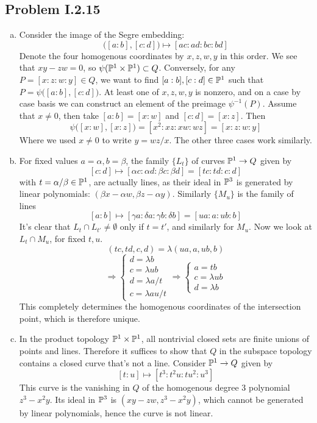 \documentclass{mathnotes}
\begin{document}
\subsection*{Problem I.2.15}
\begin{enumerate}[(a)]
\item Consider the image of the Segre embedding:
\[     \big( [a:b] , [c:d]\big) \mapsto [ac : ad : bc : bd]    \]
Denote the four homogenous coordinates by $x, z, w, y$ in this order. We see that $xy - zw = 0$, so $\psi(\mathbb{P}^1 \times \mathbb{P}^1) \subset Q$. Conversely, for any $P = [x:z:w:y] \in Q$, we want to find $[a:b], [c:d] \in \mathbb{P}^1$ such that $P = \psi\big([a:b], [c:d] \big)$. At least one of $x,z,w,y$ is nonzero, and on a case by case basis we can construct an element of the preimage $\psi^{-1}(P)$. Assume that $x\neq 0$, then take $[a:b] = [x:w]$ and $[c:d] = [x:z]$. Then
\[        \psi\big([x:w], [x:z] \big) = [x^2 : xz : xw: wz] = [x: z: w: y]    \]
Where we used $x\neq 0$ to write $y = wz/x$. The other three cases work similarly.
\item For fixed values $a = \alpha, b = \beta$, the family $\{L_t\}$ of curves $\mathbb{P}^1 \to Q$ given by
\[       [c:d] \mapsto [\alpha c : \alpha d : \beta c : \beta d ] = [t c : t d : c : d]   \]
with $t=\alpha/\beta \in \mathbb{P}^1$, are actually lines, as their ideal in $\mathbb{P}^3$ is generated by linear polynomials: $(\beta x - \alpha w, \beta z - \alpha y)$. Similarly $\{M_u\}$ is the family of lines
\[         [a:b] \mapsto [\gamma a : \delta a : \gamma b : \delta b]   = [u a : a : ub:b]    \]
It's clear that $L_t \cap L_{t'} \neq \emptyset$ only if $t=t'$, and similarly for $M_u$. Now we look at $L_t \cap M_u$, for fixed $t,u$.
\[       (tc, td, c,d) = \lambda (ua, a, ub, b)      \]
\[    \Rightarrow   \begin{cases}      d = \lambda b \\ c = \lambda ub \\ d = \lambda a/t \\ c = \lambda a u/t        \end{cases}  \Rightarrow  \begin{cases} a = tb \\ c = \lambda ub \\ d = \lambda b \end{cases}  \]
This completely determines the homogenous coordinates of the intersection point, which is therefore unique.
\item In the product topology $\mathbb{P}^1 \times \mathbb{P}^1$, all nontrivial closed sets are finite unions of points and lines. Therefore it suffices to show that $Q$ in the subspace topology contains a closed curve that's not a line. Consider $\mathbb{P}^1 \to Q$ given by
\[    [t : u] \mapsto [t^3 : t^2 u : tu^2 : u^3]      \]
This curve is the vanishing in $Q$ of the homogenous degree 3 polynomial $z^3 - x^2y$. Its ideal in $\mathbb{P}^3$ is $(xy-zw, z^3 - x^2y)$, which cannot be generated by linear polynomials, hence the curve is not linear. 
\end{enumerate}
\end{document}
